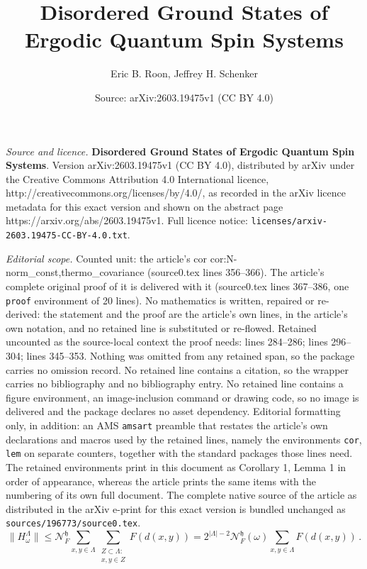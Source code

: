 \documentclass[10pt,a4paper]{amsart}
\title{\huge\textbf{Disordered Ground States of Ergodic Quantum Spin Systems}}
\author{Eric B. Roon, Jeffrey H. Schenker}
\date{Source: arXiv:2603.19475v1 (CC BY 4.0)}
\newcommand{\calN}{\mathcal{N}^{\mathfrak{h}}_F}
\begin{document}
\maketitle

\noindent\emph{Source and licence.} \huge\textbf{Disordered Ground States of Ergodic Quantum Spin Systems}. Version arXiv:2603.19475v1 (CC BY 4.0), distributed by arXiv under the Creative Commons Attribution 4.0 International licence, http://creativecommons.org/licenses/by/4.0/, as recorded in the arXiv licence metadata for this exact version and shown on the abstract page https://arxiv.org/abs/2603.19475v1. Full licence notice: \texttt{licenses/arxiv-2603.19475-CC-BY-4.0.txt}.\par\smallskip

\noindent\textit{Editorial scope.} Counted unit: the article's cor cor:N-norm\_const,thermo\_covariance (source0.tex lines 356--366). The article's complete original proof of it is delivered with it (source0.tex lines 367--386, one \texttt{proof} environment of 20 lines). No mathematics is written, repaired or re-derived: the statement and the proof are the article's own lines, in the article's own notation, and no retained line is substituted or re-flowed.  Retained uncounted as the source-local context the proof needs: lines 284--286; lines 296--304; lines 345--353.  Nothing was omitted from any retained span, so the package carries no omission record.  No retained line contains a citation, so the wrapper carries no bibliography and no bibliography entry.  No retained line contains a figure environment, an image-inclusion command or drawing code, so no image is delivered and the package declares no asset dependency.  Editorial formatting only, in addition: an AMS \texttt{amsart} preamble that restates the article's own declarations and macros used by the retained lines, namely the environments \texttt{cor}, \texttt{lem} on separate counters, together with the standard packages those lines need.  The retained environments print in this document as Corollary 1, Lemma 1 in order of appearance, whereas the article prints the same items with the numbering of its own full document.  The complete native source of the article as distributed in the arXiv e-print for this exact version is bundled unchanged as \texttt{sources/196773/source0.tex}.
    \begin{equation}\label{eqn:calN_to_esssup}
        \|H^{\Lambda}_\omega\| \le \calN \sum_{x,y\in \Lambda} \sum_{\substack{Z\subset \Lambda \colon\\ x,y\in Z}}F(d(x,y)) = 2^{|\Lambda|-2}\calN(\omega) \sum_{x,y\in \Lambda}F(d(x,y))\,.
    \end{equation} 
\end{document}
